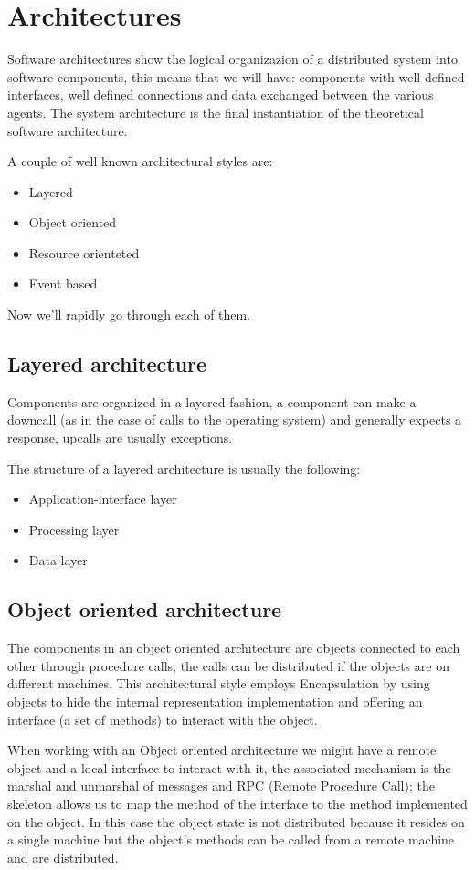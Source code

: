 \chapter{Architectures}
Software architectures show the logical organizazion of a distributed system into software components, this means that we will have: components with well-defined interfaces, well defined connections and data exchanged between the various agents. The system architecture is the final instantiation of the theoretical software architecture.

A couple of well known architectural styles are:
\begin{itemize}
    \item Layered
    \item Object oriented
    \item Resource orienteted
    \item Event based
\end{itemize}
Now we'll rapidly go through each of them.

\section{Layered architecture}
Components are organized in a layered fashion, a component can make a downcall (as in the case of calls to the operating system) and generally expects a response, upcalls are usually exceptions.

The structure of a layered architecture is usually the following:
\begin{itemize}
    \item Application-interface layer
    \item Processing layer
    \item Data layer
\end{itemize}

\section{Object oriented architecture}
The components in an object oriented architecture are objects connected to each other through procedure calls, the calls can be distributed if the objects are on different machines. This architectural style employs Encapsulation by using objects to hide the internal representation implementation and offering an interface (a set of methods) to interact with the object.

When working with an Object oriented architecture we might have a remote object and a local interface to interact with it, the associated mechanism is the marshal and unmarshal of messages and RPC (Remote Procedure Call); the skeleton allows us to map the method of the interface to the method implemented on the object. In this case the object state is not distributed because it resides on a single machine but the object's methods can be called from a remote machine and are distributed.

